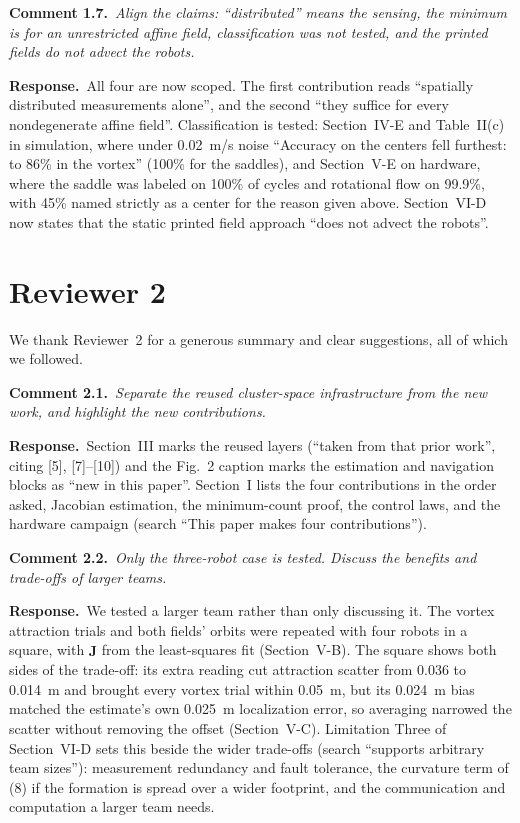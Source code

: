 \documentclass[10pt]{article}
\newcommand{\rev}[1]{#1}                             %
\newcommand{\cmt}[2]{\textbf{Comment #1.}~\textit{#2}\par}
\newcommand{\resp}{\par\textbf{Response.}~}
\begin{document}
\cmt{1.7}{Align the claims: ``distributed'' means the sensing, the minimum is for an unrestricted affine field, classification was not tested, and the printed fields do not advect the robots.}

\resp All four are now scoped. The first contribution reads ``spatially distributed measurements alone'', and the second ``they suffice for every nondegenerate affine field''. Classification is tested: Section~IV-E and Table~II(c) in simulation, where under 0.02~m/s noise ``Accuracy on the centers fell furthest: to \rev{86}\% in the vortex'' (\rev{100}\% for the saddles), and Section~V-E on hardware, where the saddle was labeled on \rev{100}\% of cycles and rotational flow on \rev{99.9}\%, with \rev{45}\% named strictly as a center for the reason given above. Section~VI-D now states that the static printed field approach ``does not advect the robots''.

\newpage
\section*{Reviewer 2}

We thank Reviewer~2 for a generous summary and clear suggestions, all of which we followed.

\cmt{2.1}{Separate the reused cluster-space infrastructure from the new work, and highlight the new contributions.}

\resp Section~III marks the reused layers (``taken from that prior work'', citing [5], [7]--[10]) and the Fig.~2 caption marks the estimation and navigation blocks as ``new in this paper''. Section~I lists the four contributions in the order asked, Jacobian estimation, the minimum-count proof, the control laws, and the hardware campaign (search ``This paper makes four contributions'').

\cmt{2.2}{Only the three-robot case is tested. Discuss the benefits and trade-offs of larger teams.}

\resp We tested a larger team rather than only discussing it. The vortex attraction trials and both fields' orbits were repeated with four robots in a square, with $\hat{\mathbf{J}}$ from the least-squares fit (Section~V-B). The square shows both sides of the trade-off: its extra reading cut attraction scatter from \rev{0.036} to \rev{0.014}~m and brought every vortex trial within 0.05~m, but its \rev{0.024}~m bias matched the estimate's own \rev{0.025}~m localization error, so averaging narrowed the scatter without removing the offset (Section~V-C). Limitation Three of Section~VI-D sets this beside the wider trade-offs (search ``supports arbitrary team sizes''): measurement redundancy and fault tolerance, the curvature term of (8) if the formation is spread over a wider footprint, and the communication and computation a larger team needs.
\end{document}
